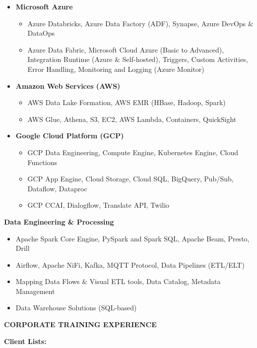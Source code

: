 \documentclass[a4paper]{article}
\begin{document}
\begin{itemize}
\item
  \textbf{Microsoft Azure}

  \begin{itemize}
  \item
    Azure Databricks, Azure Data Factory (ADF), Synapse, Azure DevOps \&
    DataOps
  \item
    Azure Data Fabric, Microsoft Cloud Azure (Basic to Advanced),
    Integration Runtime (Azure \& Self-hosted), Triggers, Custom
    Activities, Error Handling, Monitoring and Logging (Azure Monitor)
  \end{itemize}
\item
  \textbf{Amazon Web Services (AWS)}

  \begin{itemize}
  \item
    AWS Data Lake Formation, AWS EMR (HBase, Hadoop, Spark)
  \item
    AWS Glue, Athena, S3, EC2, AWS Lambda, Containers, QuickSight
  \end{itemize}
\item
  \textbf{Google Cloud Platform (GCP)}

  \begin{itemize}
  \item
    GCP Data Engineering, Compute Engine, Kubernetes Engine, Cloud
    Functions
  \item
    GCP App Engine, Cloud Storage, Cloud SQL, BigQuery, Pub/Sub,
    Dataflow, Dataproc
  \item
    GCP CCAI, Dialogflow, Translate API, Twilio
  \end{itemize}
\end{itemize}

\textbf{Data Engineering \& Processing}

\begin{itemize}
\item
  Apache Spark Core Engine, PySpark and Spark SQL, Apache Beam, Presto,
  Drill
\item
  Airflow, Apache NiFi, Kafka, MQTT Protocol, Data Pipelines (ETL/ELT)
\item
  Mapping Data Flows \& Visual ETL tools, Data Catalog, Metadata
  Management
\item
  Data Warehouse Solutions (SQL-based)
\end{itemize}

\textbf{CORPORATE TRAINING EXPERIENCE}

\textbf{Client Lists:}
\end{document}

